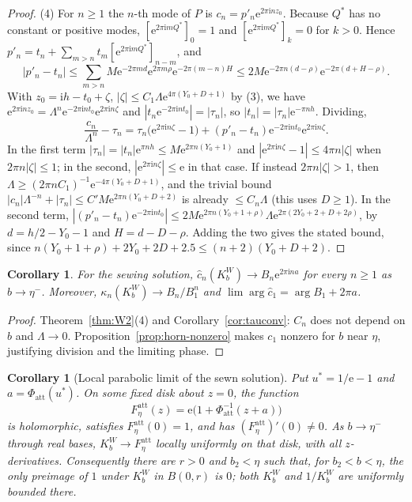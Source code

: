 \documentclass[11pt,a4paper]{article}
\newtheorem{corollary}[theorem]{Corollary}
\theoremstyle{definition}
\newcommand{\Kk}{K}
\newcommand{\eee}{\mathrm{e}}
\newcommand{\ii}{\mathrm{i}}
\begin{document}
\begin{proof}
(4) For $n\ge1$ the $n$-th mode of $P$ is $c_n=p'_n\eee^{2\pi\ii nz_0}$.
Because $Q^*$ has no constant or positive modes,
$[\eee^{2\pi\ii mQ^*}]_0=1$ and $[\eee^{2\pi\ii mQ^*}]_k=0$ for $k>0$.  Hence
$p'_n=t_n+\sum_{m>n}t_m[\eee^{2\pi\ii mQ^*}]_{n-m}$, and
\[
 |p'_n-t_n|\le\sum_{m>n}M\eee^{-2\pi md}\eee^{2\pi m\rho}\eee^{-2\pi(m-n)H}
 \le2M\eee^{-2\pi n(d-\rho)}\eee^{-2\pi(d+H-\rho)} .
\]
With $z_0=\ii h-t_0+\zeta$, $|\zeta|\le C_1\Lambda\eee^{4\pi(Y_0+D+1)}$ by (3), we have
$\eee^{2\pi\ii nz_0}=\Lambda^n\eee^{-2\pi\ii nt_0}\eee^{2\pi\ii n\zeta}$ and
$|t_n\eee^{-2\pi\ii nt_0}|=|\tau_n|$, so
$|t_n|=|\tau_n|\eee^{-\pi nh}$.  Dividing,
\[
 \frac{c_n}{\Lambda^n}-\tau_n=\tau_n\bigl(\eee^{2\pi\ii n\zeta}-1\bigr)
 +(p'_n-t_n)\eee^{-2\pi\ii nt_0}\eee^{2\pi\ii n\zeta}.
\]
In the first term $|\tau_n|=|t_n|\eee^{\pi nh}\le M\eee^{2\pi n(Y_0+1)}$ and
$|\eee^{2\pi\ii n\zeta}-1|\le4\pi n|\zeta|$ when $2\pi n|\zeta|\le1$; in
the second, $|\eee^{2\pi\ii n\zeta}|\le\eee$ in that case.  If instead
$2\pi n|\zeta|>1$, then
$\Lambda\ge(2\pi nC_1)^{-1}\eee^{-4\pi(Y_0+D+1)}$, and the trivial bound
$|c_n|\Lambda^{-n}+|\tau_n|\le C'M\eee^{2\pi n(Y_0+D+2)}$ is already
$\le C_n\Lambda$ (this uses $D\ge1$).  In the second term,
$|(p'_n-t_n)\eee^{-2\pi\ii nt_0}|\le2M\eee^{2\pi n(Y_0+1+\rho)}\Lambda
\eee^{2\pi(2Y_0+2+D+2\rho)}$, by $d=h/2-Y_0-1$ and $H=d-D-\rho$.  Adding the two
gives the stated bound, since
$n(Y_0+1+\rho)+2Y_0+2D+2.5\le(n+2)(Y_0+D+2)$.
\end{proof}

\begin{corollary}\label{cor:Kw}
For the sewing solution, $\hat c_n(\Kk^W_b)\to B_n\eee^{2\pi\ii na}$ for every
$n\ge1$ as $b\to\eta^-$.  Moreover,
$\kappa_n(\Kk^W_b)\to B_n/B_1^n$ and
$\lim\arg\hat c_1=\arg B_1+2\pi a$.
\end{corollary}

\begin{proof}
Theorem~\ref{thm:W2}(4) and Corollary~\ref{cor:tauconv}: $C_n$ does not depend
on $b$ and $\Lambda\to0$.  Proposition~\ref{prop:horn-nonzero} makes $c_1$
nonzero for $b$ near $\eta$, justifying division and the limiting phase.
\end{proof}

\begin{corollary}[Local parabolic limit of the sewn solution]
\label{cor:sewn-cusp-local}
Put $u^*=1/\eee-1$ and $a=\Phi_{\mathrm{att}}(u^*)$.  On some fixed disk
about $z=0$, the function
\[
 F_\eta^{\mathrm{att}}(z)
 =\eee\bigl(1+\Phi_{\mathrm{att}}^{-1}(z+a)\bigr)
\]
is holomorphic, satisfies $F_\eta^{\mathrm{att}}(0)=1$, and has
$(F_\eta^{\mathrm{att}})'(0)\ne0$.  As $b\to\eta^-$ through real bases,
$\Kk_b^W\to F_\eta^{\mathrm{att}}$ locally uniformly on that disk,
with all $z$-derivatives.  Consequently there are $r>0$ and $b_2<\eta$
such that, for $b_2<b<\eta$, the only preimage of $1$ under $\Kk_b^W$
in $B(0,r)$ is $0$; both $\Kk_b^W$ and $1/\Kk_b^W$ are uniformly
bounded there.
\end{corollary}
\end{document}
